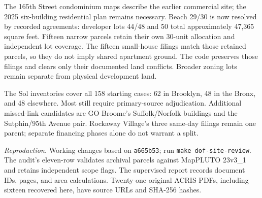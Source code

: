 The 165th Street condominium maps describe the earlier commercial site; the
2025 six-building residential plan remains necessary. Beach 29/30 is now
resolved by recorded agreements: developer lots 44/48 and 50 total approximately
47,365 square feet. Fifteen narrow parcels retain their own 30-unit allocation
and independent lot coverage. The fifteen small-house filings match those
retained parcels, so they do not imply shared apartment ground. The code
preserves those filings and clears only their documented land conflicts.
Broader zoning lots remain separate from physical development land.

The Sol inventories cover all 158 starting cases: 62 in Brooklyn, 48 in the
Bronx, and 48 elsewhere. Most still require primary-source adjudication.
Additional missed-link candidates are GO Broome's Suffolk/Norfolk buildings
and the Sutphin/95th Avenue pair. Rockaway Village's three same-day filings
remain one parent; separate financing phases alone do not warrant a split.

\textit{Reproduction.} Working changes based on \texttt{a665b53}; run
\texttt{make dof-site-review}. The audit's eleven-row
 validates archival parcels against
MapPLUTO 23v3\_1 and retains independent scope flags. The supervised report
records document IDs, pages, and area calculations. Twenty-one original ACRIS
PDFs, including sixteen recovered here, have source URLs and SHA-256 hashes.
